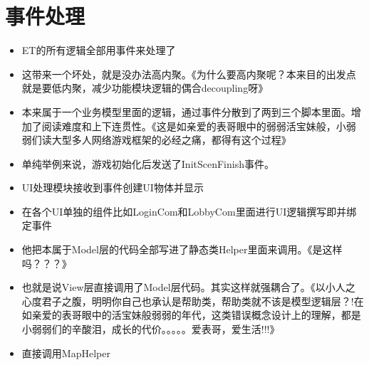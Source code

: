 \documentclass[9pt, b5paper]{article}
\begin{document}
\section{事件处理}
\label{sec-20}
\begin{itemize}
\item ET的所有逻辑全部用事件来处理了
\item 这带来一个坏处，就是没办法高内聚。《为什么要高内聚呢？本来目的出发点就是要低内聚，减少功能模块逻辑的偶合decoupling呀》
\item 本来属于一个业务模型里面的逻辑，通过事件分散到了两到三个脚本里面。增加了阅读难度和上下连贯性。《这是如亲爱的表哥眼中的弱弱活宝妹般，小弱弱们读大型多人网络游戏框架的必经之痛，都得有这个过程》
\item 单纯举例来说，游戏初始化后发送了InitScenFinish事件。
\item UI处理模块接收到事件创建UI物体并显示
\item 在各个UI单独的组件比如LoginCom和LobbyCom里面进行UI逻辑撰写即并绑定事件
\item 他把本属于Model层的代码全部写进了静态类Helper里面来调用。《是这样吗？？？》
\item 也就是说View层直接调用了Model层代码。其实这样就强耦合了。《以小人之心度君子之腹，明明你自己也承认是帮助类，帮助类就不该是模型逻辑层？!在如亲爱的表哥眼中的活宝妹般弱弱的年代，这类错误概念设计上的理解，都是小弱弱们的辛酸泪，成长的代价。。。。。爱表哥，爱生活!!!》
\item 直接调用MapHelper
\end{itemize}
\end{document}
